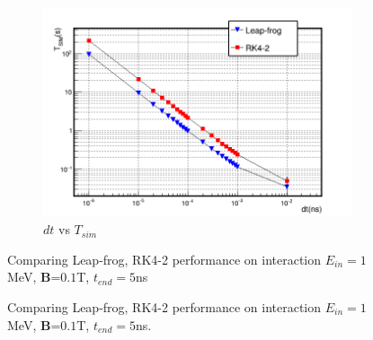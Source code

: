 \documentclass[a4paper,oneside,12pt]{report}
\numberwithin{equation}{chapter}
\begin{document}
\begin{figure}
    \begin{subfigure}{0.8\textwidth}
        \centering
        \includegraphics[width=\linewidth]{./figures/analiz/mag_lf_rk2_dt-Tsim.png}
        \caption*{$dt$ vs $T_{sim}$}
    \end{subfigure}
    \caption{Comparing Leap-frog, RK4-2 performance on \eB interaction $E_{in}=1$MeV, \textbf{B}=$0.1$T, $t_{end}=5$ns}
    \label{fig:mag_lf_rk2_comparison}
\end{figure} \fi
\begin{figure}[h]
    \centering
    \qquad{}%
    \vspace{20pt}
    \caption{Comparing Leap-frog, RK4-2 performance on \eB interaction $E_{in}=1$MeV, \textbf{B}=$0.1$T, $t_{end}=5$ns.}
    \label{fig:mag_lf_rk2_comparison}
\end{figure}
\end{document}

